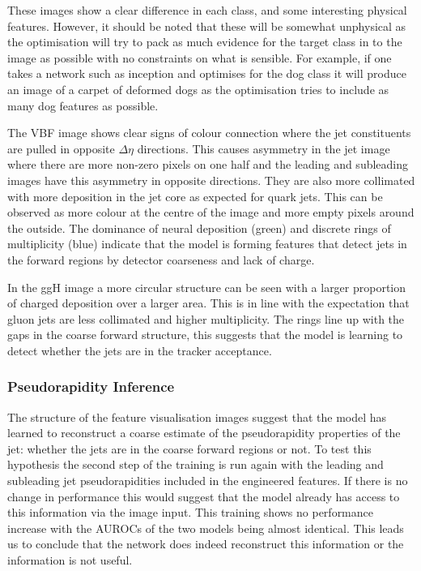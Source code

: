 These images show a clear difference in each class, and some interesting physical features. However, it should be noted that these will be somewhat unphysical as the optimisation will try to pack as much evidence for the target class in to the image as possible with no constraints on what is sensible. For example, if one takes a network such as inception and optimises for the dog class it will produce an image of a carpet of deformed dogs as the optimisation tries to include as many dog features as possible. 


The VBF image shows clear signs of colour connection where the jet constituents are pulled in opposite $\Delta\eta$ directions. This causes asymmetry in the jet image where there are more non-zero pixels on one half and the leading and subleading images have this asymmetry in opposite directions.
They are also more collimated with more \pt  deposition in the jet core as expected for quark jets. This can be observed as more colour at the centre of the image and more empty pixels around the outside. The dominance of neural \pt deposition (green) and discrete rings of multiplicity (blue) indicate that the model is forming features that detect jets in the forward regions by detector coarseness and lack of charge. 

In the ggH image a more circular structure can be seen with a larger proportion of charged deposition over a larger area. This is in line with the expectation that gluon jets are less collimated and higher multiplicity. The rings line up with the gaps in the coarse forward structure, this suggests that the model is learning to detect whether the jets are in the tracker acceptance. 


\subsubsection{Pseudorapidity Inference}
The structure of the feature visualisation images suggest that the model has learned to reconstruct a coarse estimate of the pseudorapidity properties of the jet: whether the jets are in the coarse forward regions or not. 
To test this hypothesis the second step of the training is run again with the leading and subleading jet pseudorapidities included in the engineered features. If there is no change in performance this would suggest that the model already has access to this information via the image input. This training shows no performance increase with the AUROCs of the two models being almost identical. This leads us to conclude that the network does indeed reconstruct this information or the information is not useful.

